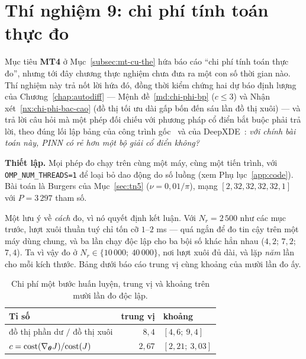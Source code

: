 \section{Thí nghiệm 9: chi phí tính toán thực đo}
\label{sec:tn9}

\begin{thinghiem}
\label{tn:chiphi}
Mục tiêu \textbf{MT4} ở Mục~\ref{subsec:mt-cu-the} hứa báo cáo ``chi phí
tính toán thực đo'', nhưng tới đây chương thực nghiệm chưa đưa ra một con số
thời gian nào. Thí nghiệm này trả nốt lời hứa đó, đồng thời kiểm chứng hai dự
báo định lượng của Chương~\ref{chap:autodiff} --- Mệnh đề~\ref{md:chi-phi-bp}
($c \le 3$) và Nhận xét~\ref{nx:chi-phi-bac-cao} (đồ thị tối ưu dài gấp bốn đến
sáu lần đồ thị xuôi) --- và trả lời câu hỏi mà một phép đối chiếu với phương
pháp cổ điển bắt buộc phải trả lời, theo đúng lối lập bảng của công trình
gốc~\cite{raissi2019} và của DeepXDE~\cite{lu2021}: \emph{với chính bài toán
này, PINN có rẻ hơn một bộ giải cổ điển không?}
\end{thinghiem}

\textbf{Thiết lập.} Mọi phép đo chạy trên cùng một máy, cùng một tiến trình, với
\texttt{OMP\_NUM\_THREADS=1} để loại bỏ dao động do số luồng
(xem Phụ lục~\ref{app:code}). Bài toán là Burgers của Mục~\ref{sec:tn5}
($\nu = 0{,}01/\pi$), mạng $[2, 32, 32, 32, 32, 1]$ với $P = 3\,297$ tham số.

Một lưu ý về \emph{cách} đo, vì nó quyết định kết luận. Với $N_r = 2\,500$ như
các mục trước, lượt xuôi thuần tuý chỉ tốn cỡ $1$--$2$ ms --- quá ngắn để đo tin
cậy trên một máy dùng chung, và ba lần chạy độc lập cho ba bội số khác hẳn nhau
($4{,}2$; $7{,}2$; $7{,}4$). Ta vì vậy đo ở $N_r \in \{10\,000;\ 40\,000\}$, nơi
lượt xuôi đủ dài, và lặp \emph{năm} lần cho mỗi kích thước. Bảng dưới báo cáo
trung vị cùng khoảng của mười lần đo ấy.

\begin{table}[H]
\centering
\caption[Chi phí một bước huấn luyện PINN]{Chi phí một bước huấn luyện, trung vị
và khoảng trên mười lần đo độc lập.}
\label{tab:tn9-buoc}
\small
\begin{tabular}{@{}l r l@{}}
\toprule
\textbf{Tỉ số} & \textbf{trung vị} & \textbf{khoảng} \\
\midrule
đồ thị phần dư $/$ đồ thị xuôi
  & $8{,}4$ & $[4{,}6;\ 9{,}4]$ \\
$c = \mathrm{cost}(\nabla_{\bm{\theta}}J) / \mathrm{cost}(J)$
  & $2{,}67$ & $[2{,}21;\ 3{,}03]$ \\
\bottomrule
\end{tabular}
\end{table}

